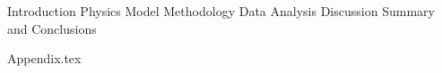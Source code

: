 \documentclass[aps,pra,reprint,showpacs,nofootinbib,superscriptaddress]{revtex4-1}
\begin{document}
\maketitle

{Introduction}
{Physics Model}
{Methodology}
{Data Analysis}
{Discussion}
{Summary and Conclusions}

%
%


%


{Appendix.tex}
\end{document}
